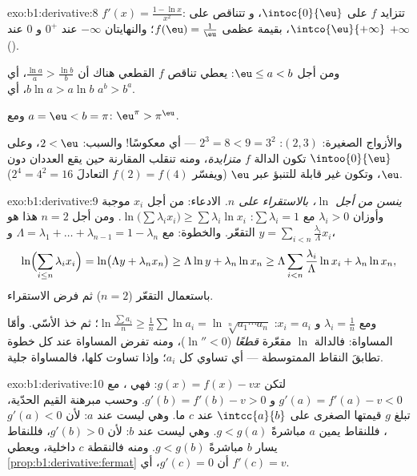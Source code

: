 \begin{solution}{exo:b1:derivative:8}
$f'(x) = \frac{1 - \ln x}{x^2}$: تتزايد $f$ على $\intoc{0}{\eu}$، و
تتناقص على $\intco{\eu}{+\infty}$، بقيمة عظمى $f(\eu) =
\frac1\eu$؛ والنهايتان $-\infty$ عند $0^+$ و $0$ عند $+\infty$ ().

ومن أجل $\eu \leq a < b$: يعطي تناقص $f$ القطعي هناك أن
$\frac{\ln a}{a} > \frac{\ln b}{b}$، أي $b \ln a > a \ln b$،
أي $a^b > b^a$.

ومع $a = \eu < b = \pi$: $\eu^\pi > \pi^\eu$.

والأزواج الصغيرة: $(2, 3)$: $2^3 = 8 < 9 = 3^2$ --- أي معكوسًا! والسبب:
$2 < \eu$، وعلى $\intoo{0}{\eu}$ تكون الدالة $f$
\emph{متزايدة}، ومنه تنقلب المقارنة حين يقع العددان
دون $\eu$، وتكون غير قابلة للتنبؤ عبر $\eu$ (ويفسّر $f(2) = f(4)$
التعادلَ $2^4 = 4^2 = 16$).
\end{solution}

\begin{solution}{exo:b1:derivative:9}
\emph{ينسن من أجل $\ln$، بالاستقراء على $n$.} الادعاء: من أجل
$x_i$ موجبة وأوزان $\lambda_i > 0$ مع $\sum \lambda_i = 1$:
$\ln\bigl(\sum \lambda_i x_i\bigr) \geq \sum \lambda_i \ln x_i$. ومن أجل
$n = 2$ هذا هو التقعّر. والخطوة: مع $\Lambda = \lambda_1 + \dots +
\lambda_{n-1} = 1 - \lambda_n$ و $y = \sum_{i<n}
\frac{\lambda_i}{\Lambda} x_i$،
\[
\ln\Bigl(\sum_{i \leq n} \lambda_i x_i\Bigr)
= \ln\bigl(\Lambda y + \lambda_n x_n\bigr)
\geq \Lambda \ln y + \lambda_n \ln x_n
\geq \Lambda \sum_{i<n} \frac{\lambda_i}{\Lambda}\ln x_i
+ \lambda_n \ln x_n,
\]
باستعمال التقعّر ($n = 2$) ثم فرض الاستقراء.

ومع $\lambda_i = \frac 1n$ و $x_i = a_i$: $\ln\frac{\sum a_i}{n}
\geq \frac 1n \sum \ln a_i = \ln\sqrt[n]{a_1\cdots a_n}$؛
ثم خذ الأسّي. وأمّا المساواة: فالدالة $\ln$ مقعّرة \emph{قطعًا} ($\ln'' < 0$)،
ومنه تفرض المساواة عند كل خطوة تطابقَ النقاط الممتوسطة ---
أي تساوي كل $a_i$؛ وإذا تساوت كلها، فالمساواة جلية.
\end{solution}

\begin{solution}{exo:b1:derivative:10}
لتكن $g(x) = f(x) - vx$: فهي ، مع $g'(a) = f'(a) - v < 0$
و $g'(b) = f'(b) - v > 0$. وحسب مبرهنة القيم الحدّية، تبلغ $g$
قيمتها الصغرى على $\intcc{a}{b}$ عند $c$ ما. وهي ليست عند $a$:
لأن $g'(a) < 0$، فللنقاط يمين $a$ مباشرةً $g < g(a)$. وهي
ليست عند $b$: لأن $g'(b) > 0$، فللنقاط يسار $b$ مباشرةً $g <
g(b)$. ومنه فالنقطة $c$ داخلية، ويعطي \cref{prop:b1:derivative:fermat}
أن $g'(c) = 0$، أي $f'(c) = v$.
\end{solution}

